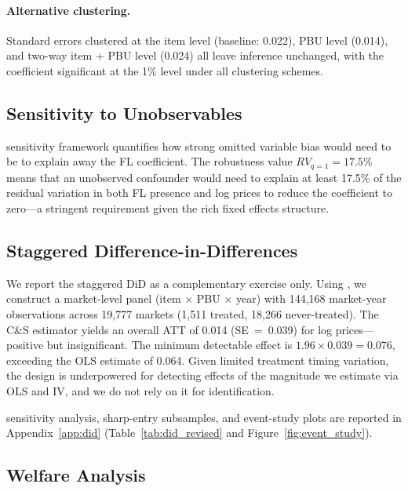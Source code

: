 \paragraph{Alternative clustering.}
Standard errors clustered at the item level (baseline: 0.022), PBU level
(0.014), and two-way item + PBU level (0.024) all leave inference
unchanged, with the coefficient significant at the 1\% level under all
clustering schemes.

\subsection{Sensitivity to Unobservables}

\cites{cinelli2020making} sensitivity framework quantifies how strong
omitted variable bias would need to be to explain away the FL
coefficient. The robustness value $RV_{q=1} = 17.5\%$ means that an
unobserved confounder would need to explain at least 17.5\% of the
residual variation in both FL presence and log prices to reduce the
coefficient to zero---a stringent requirement given the rich fixed
effects structure.

\subsection{Staggered Difference-in-Differences}

We report the staggered DiD as a complementary exercise only. Using
\citet{callaway2021difference}, we construct a market-level panel (item
$\times$ PBU $\times$ year) with 144,168 market-year observations across
19,777 markets (1,511 treated, 18,266 never-treated). The C\&S estimator
yields an overall ATT of 0.014 (SE~=~0.039) for log prices---positive
but insignificant. The minimum detectable effect is
$1.96 \times 0.039 = 0.076$, exceeding the OLS estimate of 0.064.
Given limited treatment timing variation, the design is underpowered for
detecting effects of the magnitude we estimate via OLS and IV, and we do
not rely on it for identification.

\cites{rambachan2023more} sensitivity analysis, sharp-entry subsamples,
and event-study plots are reported in Appendix~\ref{app:did}
(Table~\ref{tab:did_revised} and Figure~\ref{fig:event_study}).

\subsection{Welfare Analysis}
\label{sec:welfare}

